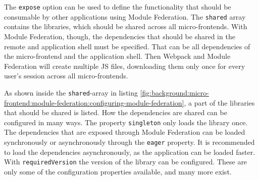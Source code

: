 \noindent The \texttt{expose} option can be used to define the functionality that should be consumable by other applications using Module Federation. The \texttt{shared} array contains the libraries, which should be shared across all micro-frontends. With Module Federation, though, the dependencies that should be shared in the remote and application shell must be specified. That can be all dependencies of the micro-frontend and the application shell. Then Webpack and Module Federation will create multiple \ac{JS} files, downloading them only once for every user's session across all micro-frontends. \cite[125]{book:2021:mezzalira:applied-methods:building-micro-frontends}

\bigskip

\noindent As shown inside the \texttt{shared}-array in listing \ref{fig:background:micro-frontend:module-federation:configuring-module-federation}, a part of the libraries that should be shared is listed. How the dependencies are shared can be configured in many ways. The property \texttt{singleton} only loads the library once. The dependencies that are exposed through Module Federation can be loaded synchronously or asynchronously through the \texttt{eager} property. It is recommended to load the dependencies asynchronously, as the application can be loaded faster. With \texttt{requiredVersion} the version of the library can be configured. These are only some of the configuration properties available, and many more exist. \cite[125]{book:2021:mezzalira:applied-methods:building-micro-frontends}
